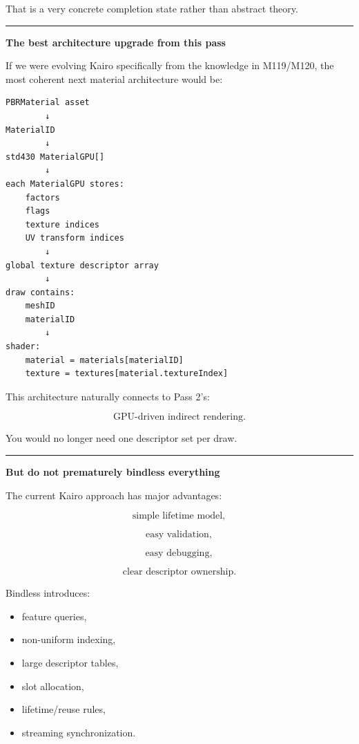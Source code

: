 That is a very concrete completion state rather than abstract theory.

\begin{center}\rule{0.5\linewidth}{0.5pt}\end{center}

\textbf{The best architecture upgrade from this pass}

If we were evolving Kairo specifically from the knowledge in M119/M120, the most coherent next material architecture would be:

\begin{verbatim}
PBRMaterial asset
        ↓
MaterialID
        ↓
std430 MaterialGPU[]
        ↓
each MaterialGPU stores:
    factors
    flags
    texture indices
    UV transform indices
        ↓
global texture descriptor array
        ↓
draw contains:
    meshID
    materialID
        ↓
shader:
    material = materials[materialID]
    texture = textures[material.textureIndex]
\end{verbatim}

This architecture naturally connects to Pass 2's:

\[
\text{GPU-driven indirect rendering}.
\]

You would no longer need one descriptor set per draw.

\begin{center}\rule{0.5\linewidth}{0.5pt}\end{center}

\textbf{But do not prematurely bindless everything}

The current Kairo approach has major advantages:

\[
\text{simple lifetime model},
\]

\[
\text{easy validation},
\]

\[
\text{easy debugging},
\]

\[
\text{clear descriptor ownership}.
\]

Bindless introduces:

\begin{itemize}
\tightlist
\item
  feature queries,
\item
  non-uniform indexing,
\item
  large descriptor tables,
\item
  slot allocation,
\item
  lifetime/reuse rules,
\item
  streaming synchronization.
\end{itemize}

